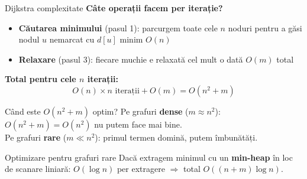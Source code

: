 \documentclass[10pt]{beamer}
\begin{document}
\begin{frame}{Dijkstra \textemdash{} complexitate}
  \textbf{Câte operații facem per iterație?}
  \begin{itemize}
    \item \textbf{Căutarea minimului} (pasul 1): parcurgem toate cele $n$ noduri pentru a găsi nodul $u$ nemarcat cu $d[u]$ minim \textemdash{} $O(n)$
    \item \textbf{Relaxare} (pasul 3): fiecare muchie e relaxată cel mult o dată \textemdash{} $O(m)$ total
  \end{itemize}

  \smallskip
  \textbf{Total pentru cele $n$ iterații:}
  \[ O(n) \times n \text{ iterații} + O(m) = O(n^2 + m) \]

  \begin{block}{Când este $O(n^2+m)$ optim?}
    Pe grafuri \textbf{dense} ($m \approx n^2$): $O(n^2+m) = O(n^2)$ \textemdash{} nu putem face mai bine.\\
    Pe grafuri \textbf{rare} ($m \ll n^2$): primul termen domină, putem îmbunătăți.
  \end{block}

  \begin{alertblock}{Optimizare pentru grafuri rare}
    Dacă extragem minimul cu un \textbf{min-heap} în loc de scanare liniară:
    $O(\log n)$ per extragere $\Rightarrow$ total $O((n+m)\log n)$.
  \end{alertblock}
\end{frame}
\end{document}
